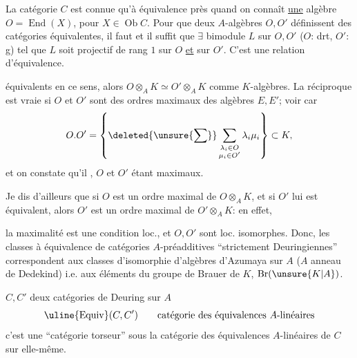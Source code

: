 La catégorie $C$ est connue qu'à équivalence  près  quand on connaît \uline{une} algèbre $O=\operatorname{End}(X)$, pour $X\in\operatorname{Ob}C$.
Pour que deux $A$-algèbres $O,O'$ définissent  des catégories  équivalentes, il faut et il suffit que $\exists$ bimodule $L$ sur $O,O'$ ($O$: drt, $O'$: g) tel que $L$ soit projectif de rang $1$ sur $O$ \uline{et} sur $O'$. C'est une relation d'équivalence.

 équivalents en ce sens, alors $O\otimes_A K\simeq O'\otimes_A K$ comme  $K$-algèbres. La réciproque est vraie si $O$ et $O'$ sont  des ordres maximaux des  algèbres   $E,E'$; 
voir car
\[
O.O'=\left\{\deleted{\unsure{\sum}}\sum_{\substack{\lambda_i\in O\\\mu_i\in O'}}\lambda_i\mu_i\right\}\subset K,
\]
et on constate qu'il , $O$ et $O'$ étant maximaux.

 Je dis d'ailleurs que si $O$ est un ordre maximal de $O\otimes_A K$, et si $O'$ lui est équivalent, alors $O'$ est un ordre maximal de $O'\otimes_A K$: en effet,

la maximalité est une condition loc., et $O,O'$ sont loc. isomorphes. Donc, les classes  à équivalence  de catégories $A$-préadditives ``strictement Deuringiennes'' correspondent aux classes d'isomorphie d'algèbres d'Azumaya  sur $A$ ($A$ anneau de Dedekind) i.e. aux éléments du groupe de Brauer de $K$, $\operatorname{Br}(\unsure{K|A})$.

$C,C'$ deux catégories de Deuring sur $A$
\[
\uline{\operatorname{Equiv}}(C,C')\qquad\text{catégorie des équivalences }A\text{-linéaires}
\]
 c'est une  ``catégorie torseur'' sous la catégorie des équivalences $A$-linéaires de $C$ sur elle-même.

